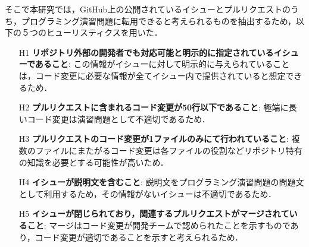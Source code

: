そこで本研究では，GitHub上の公開されているイシューとプルリクエストのうち，プログラミング演習問題に転用できると考えられるものを抽出するため，以下の５つのヒューリスティクスを用いた．
\begin{enumerate}
\item[H1] \textbf{リポジトリ外部の開発者でも対応可能と明示的に指定されているイシューであること}: この情報がイシューに対して明示的に与えられていることは，コード変更に必要な情報が全てイシュー内で提供されていると想定できるため．
\item[H2] \textbf{プルリクエストに含まれるコード変更が50行以下であること}: 極端に長いコード変更は演習問題として不適切であるため．
\item[H3] \textbf{プルリクエストのコード変更が1ファイルのみにて行われていること}: 複数のファイルにまたがるコード変更は各ファイルの役割などリポジトリ特有の知識を必要とする可能性が高いため．
\item[H4] \textbf{イシューが説明文を含むこと}: 説明文をプログラミング演習問題の問題文として利用するため，その情報がないイシューは不適切であるため．
\item[H5]  \textbf{イシューが閉じられており，関連するプルリクエストがマージされていること}: マージはコード変更が開発チームで認められたことを示すものであり，コード変更が適切であることを示すと考えられるため．
\end{enumerate}

